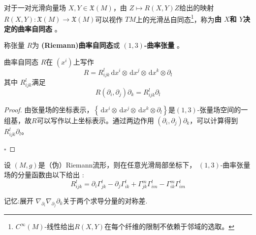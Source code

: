 \documentclass[../../几何与拓扑.tex]{subfiles}
\begin{document}
\begin{definition}
    对于一对光滑向量场 \(  X,Y   \in \mathfrak{X}\left( M \right) \)，由 \(  Z\mapsto R\left( X,Y \right)Z   \)给出的映射 \(  R\left( X,Y \right):\mathfrak{X}\left( M \right)\to \mathfrak{X}\left( M \right)     \)可以视作 \(  TM  \)上的光滑丛自同态\footnote{\(  C^{\infty}\left( M \right)   \)-线性给出\(  R\left( X,Y \right)   \)在每个纤维的限制不依赖于邻域的选取。  }，称为\textbf{由 \(  X  \)和 \(  Y  \)决定的曲率自同态  }。
    
    称张量 \(  R  \)为 \textbf{(Riemann)曲率自同态}或 \textbf{\(  \left( 1,3 \right)   \)-曲率张量 }。
\end{definition}

\begin{proposition}
    曲率自同态 \(  R  \)在 \(  \left( x^{i} \right)   \)上写作 \[
    R =  R_{ijk}^{l} \,\mathrm{d} x^{i}\otimes \,\mathrm{d} x^{j}\otimes \,\mathrm{d} x^{k}\otimes \partial _{l}
    \]其中 \(  R_{ijk}^{l}  \)满足 \[
    R\left( \partial _{i},\partial _{j} \right)\partial _{k}= R_{ijk}^{l}\partial _{l} 
    \]   
\end{proposition}
\begin{proof}
    由张量场的坐标表示，\(  \left\{ \,\mathrm{d} x^{i}\otimes \,\mathrm{d} x^{j}\otimes \,\mathrm{d} x^{k}\otimes \partial _{l} \right\}  \)是\(  \left( 1,3 \right)   \)-张量场空间的一组基，故\(  R  \)可以写作以上坐标表示。通过两边作用 \(  \left( \partial _{i},\partial _{j} \right)\partial _{k}   \)，可以计算得到 \(  R_{ijk}^{l}\partial _{l}  \)。     

    \hfill $\square$
\end{proof}

\begin{proposition}
    设 \(  \left( M,g \right)   \)是（伪）Riemann流形，则在任意光滑局部坐标下， \(  \left( 1,3 \right)   \)-曲率张量场的分量函数由以下给出 : \[
    R_{ijk}^{l}= \partial _{i} \Gamma _{jk}^{l}- \partial _{j} \Gamma _{ik}^{l}+  \Gamma _{jk}^{m} \Gamma _{im}^{l}- \Gamma _{ik}^{m} \Gamma _{im}^{l}
    \]  
\end{proposition}

\begin{note}
    记忆:展开 \(   \nabla _{ \partial _{i}} \nabla _{ \partial _{j}} \partial _{k}  \)关于两个求导分量的对称差. 
\end{note}
\end{document}
